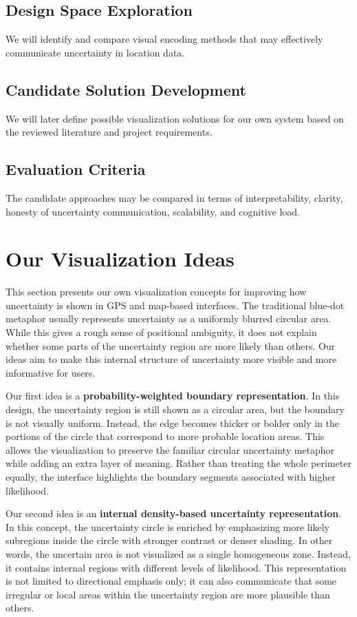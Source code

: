 \documentclass[conference]{IEEEtran}
\begin{document}
\subsection{Design Space Exploration}
We will identify and compare visual encoding methods that may effectively communicate uncertainty in location data.

\subsection{Candidate Solution Development}
We will later define possible visualization solutions for our own system based on the reviewed literature and project requirements.

\subsection{Evaluation Criteria}
The candidate approaches may be compared in terms of interpretability, clarity, honesty of uncertainty communication, scalability, and cognitive load.

\section{Our Visualization Ideas}

This section presents our own visualization concepts for improving how uncertainty is shown in GPS and map-based interfaces. The traditional blue-dot metaphor usually represents uncertainty as a uniformly blurred circular area. While this gives a rough sense of positional ambiguity, it does not explain whether some parts of the uncertainty region are more likely than others. Our ideas aim to make this internal structure of uncertainty more visible and more informative for users.

Our first idea is a \textbf{probability-weighted boundary representation}. In this design, the uncertainty region is still shown as a circular area, but the boundary is not visually uniform. Instead, the edge becomes thicker or bolder only in the portions of the circle that correspond to more probable location areas. This allows the visualization to preserve the familiar circular uncertainty metaphor while adding an extra layer of meaning. Rather than treating the whole perimeter equally, the interface highlights the boundary segments associated with higher likelihood.

Our second idea is an \textbf{internal density-based uncertainty representation}. In this concept, the uncertainty circle is enriched by emphasizing more likely subregions inside the circle with stronger contrast or denser shading. In other words, the uncertain area is not visualized as a single homogeneous zone. Instead, it contains internal regions with different levels of likelihood. This representation is not limited to directional emphasis only; it can also communicate that some irregular or local areas within the uncertainty region are more plausible than others.
\end{document}
